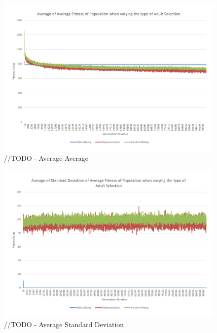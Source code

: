\begin{figure}
	\centerline{\includegraphics[width=\paperwidth]{figures/CircleTests/CircleTestAdultSelectionAverageAverage.pdf}}
	\caption{//TODO - Average Average}
\end{figure}

\begin{figure}
	\centerline{\includegraphics[width=\paperwidth]{figures/CircleTests/CircleTestAdultSelectionAverageStandardDeviation.pdf}}
	\caption{//TODO - Average Standard Deviation}
\end{figure}


